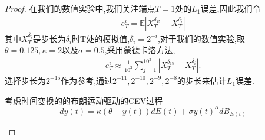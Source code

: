 \begin{proof}
	在我们的数值实验中,我们关注端点$T = 1$处的$L_1$误差,因此我们令
	\begin{align*}
		e_T^{i}=\mathbb{E}\left|X_T^{\delta _{15}}-X_T^{\delta _i}\right|
	\end{align*}
	其中$X_T^{\delta _i}$是步长为$\delta _i$时T处的模拟值,$\delta _i = 2^{-i}$,对于我们的数值实验,取$\theta=0.125,\kappa=2$以及$\sigma=0.5$,采用蒙德卡洛方法,
	\begin{align*}
		e_{T}^i\approx\frac{1}{10^3}\sum_{j=1}^{10^3}\left|X_T^{\delta _{15}}-X_T^{\delta _i}\right|.
	\end{align*}
	选择步长为$2^{-15}$作为参考,通过${2^{-11},2^{-10},2^{-9},2^{-8}}$的步长来估计$L_1$误差.
	
	\begin{example}
		考虑时间变换的的布朗运动驱动的CEV过程
		\begin{equation}\label{CEV}
			dy(t)=\kappa(\theta-y(t))dE(t)+\sigma y(t)^\alpha dB_{E(t)}
		\end{equation}
	\end{example}
	

\end{proof}
